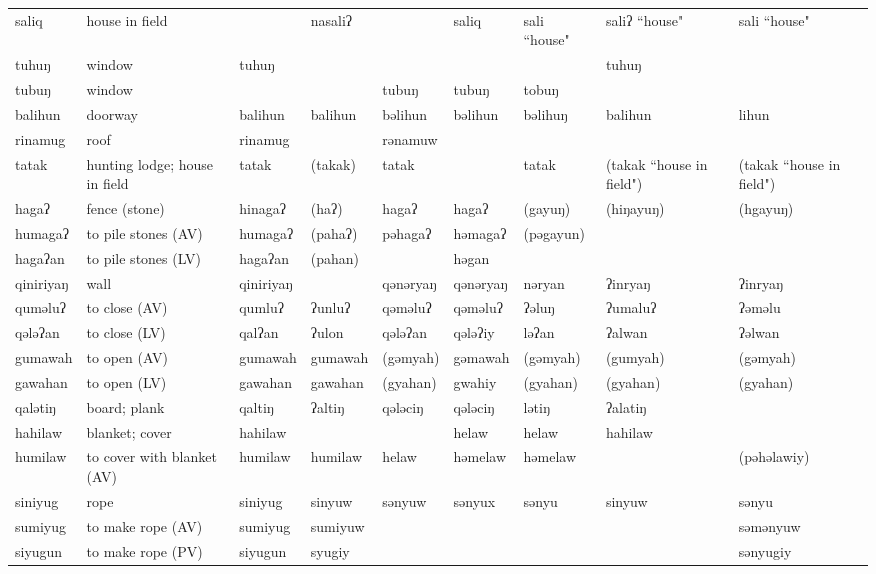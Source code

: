 \begin{landscape}
\begin{longtable}{*{9}{p{}}}
\text{*}saliq & house in field &  & nasaliʔ &  & saliq & sali ``house" & saliʔ ``house" & sali ``house"\\
\text{*}tuhuŋ & window & tuhuŋ &  &  &  &  & tuhuŋ & \\
\text{*}tubuŋ & window &  &  & tubuŋ & tubuŋ & tobuŋ &  & \\
\text{*}balihun & doorway & balihun & balihun & bəlihun & bəlihun & bəlihuŋ & balihun & lihun\\
\text{*}rinamug & roof & rinamug &  & rənamuw &  &  &  & \\
\text{*}tatak & hunting lodge; house in field & tatak & (takak) & tatak &  & tatak & (takak ``house in field") & (takak ``house in field")\\
\text{*}hagaʔ & fence (stone) & hinagaʔ & (haʔ) & hagaʔ & hagaʔ & (gayuŋ) & (hiŋayuŋ) & (hgayuŋ)\\
\text{*}humagaʔ & to pile stones (AV) & humagaʔ & (pahaʔ) & pəhagaʔ & həmagaʔ & (pəgayun) &  & \\
\text{*}hagaʔan & to pile stones (LV) & hagaʔan & (pahan) &  & həgan &  &  & \\
\text{*}qiniriyaŋ & wall & qiniriyaŋ &  & qənəryaŋ & qənəryaŋ & nəryan & ʔinryaŋ & ʔinryaŋ\\
\text{*}quməluʔ & to close (AV) & qumluʔ & ʔunluʔ & qəməluʔ & qəməluʔ & ʔəluŋ & ʔumaluʔ & ʔəməlu\\
\text{*}qələʔan & to close (LV) & qalʔan & ʔulon & qələʔan & qələʔiy & ləʔan & ʔalwan & ʔəlwan\\
\text{*}gumawah & to open (AV) & gumawah & gumawah & (gəmyah) & gəmawah & (gəmyah) & (gumyah) & (gəmyah)\\
\text{*}gawahan & to open (LV) & gawahan & gawahan & (gyahan) & gwahiy & (gyahan) & (gyahan) & (gyahan)\\
\text{*}qalətiŋ & board; plank & qaltiŋ & ʔaltiŋ & qələciŋ & qələciŋ & lətiŋ & ʔalatiŋ & \\
\text{*}hahilaw & blanket; cover & hahilaw &  &  & helaw & helaw & hahilaw & \\
\text{*}humilaw & to cover with blanket (AV) & humilaw & humilaw & helaw & həmelaw & həmelaw &  & (pəhəlawiy)\\
\text{*}siniyug & rope & siniyug & sinyuw & sənyuw & sənyux & sənyu & sinyuw & sənyu\\
\text{*}sumiyug & to make rope (AV) & sumiyug & sumiyuw &  &  &  &  & səmənyuw\\
\text{*}siyugun & to make rope (PV) & siyugun & syugiy &  &  &  &  & sənyugiy\\

\end{longtable}
\end{landscape}
